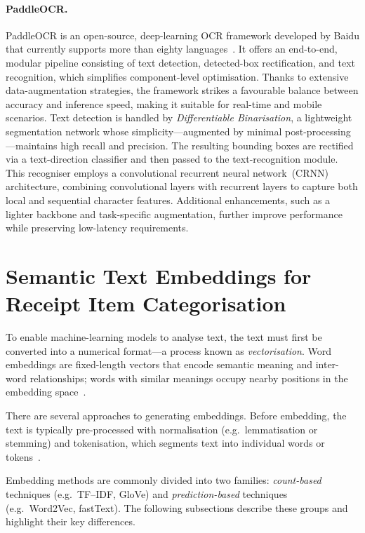 \documentclass{SGGW-thesis-EN}
\begin{document}
\paragraph{PaddleOCR.}
PaddleOCR is an open-source, deep-learning OCR framework developed by Baidu that currently
supports more than eighty languages~\cite{du2020ppocr}.
It offers an end-to-end, modular pipeline consisting of text detection, detected-box
rectification, and text recognition, which simplifies component-level optimisation.
Thanks to extensive data-augmentation strategies, the framework strikes a favourable
balance between accuracy and inference speed, making it suitable for real-time and
mobile scenarios.
Text detection is handled by \textit{Differentiable Binarisation}, a lightweight
segmentation network whose simplicity—augmented by minimal post-processing—maintains
high recall and precision.
The resulting bounding boxes are rectified via a text-direction classifier and then
passed to the text-recognition module.
This recogniser employs a convolutional recurrent neural network~(CRNN) architecture,
combining convolutional layers with recurrent layers to capture both local and
sequential character features.
Additional enhancements, such as a lighter backbone and task-specific augmentation,
further improve performance while preserving low-latency requirements.

\section{Semantic Text Embeddings for Receipt Item Categorisation}
To enable machine-learning models to analyse text, the text must first be converted into a numerical
format—a process known as \emph{vectorisation}.
Word embeddings are fixed-length vectors that encode semantic meaning and inter-word relationships;
words with similar meanings occupy nearby positions in the embedding space~\cite{almeida2023wordembeddingssurvey}.

There are several approaches to generating embeddings.
Before embedding, the text is typically pre-processed with normalisation (e.g.\ lemmatisation or stemming)
and tokenisation, which segments text into individual words or tokens~\cite{jurafsky2023slp3}.

Embedding methods are commonly divided into two families:
\emph{count-based} techniques (e.g.\ TF–IDF, GloVe) and \emph{prediction-based} techniques (e.g.\ Word2Vec,
fastText).
The following subsections describe these groups and highlight their key differences.
\end{document}
